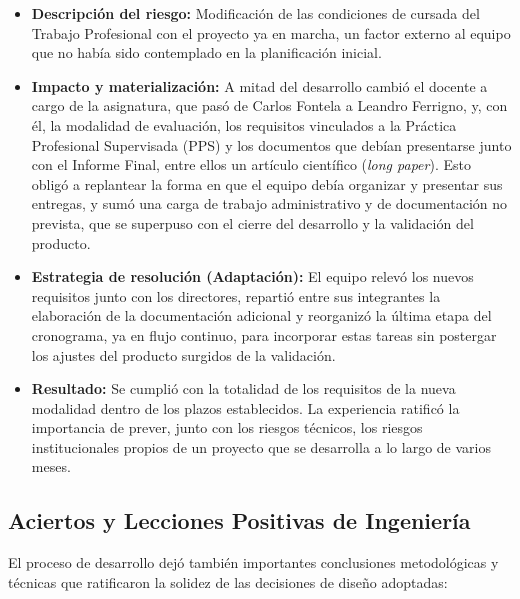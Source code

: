 \begin{itemize}
    \item \textbf{Descripción del riesgo:} Modificación de las condiciones de cursada del Trabajo Profesional con el proyecto ya en marcha, un factor externo al equipo que no había sido contemplado en la planificación inicial.
    \item \textbf{Impacto y materialización:} A mitad del desarrollo cambió el docente a cargo de la asignatura, que pasó de Carlos Fontela a Leandro Ferrigno, y, con él, la modalidad de evaluación, los requisitos vinculados a la Práctica Profesional Supervisada (PPS) y los documentos que debían presentarse junto con el Informe Final, entre ellos un artículo científico (\textit{long paper}). Esto obligó a replantear la forma en que el equipo debía organizar y presentar sus entregas, y sumó una carga de trabajo administrativo y de documentación no prevista, que se superpuso con el cierre del desarrollo y la validación del producto.
    \item \textbf{Estrategia de resolución (Adaptación):} El equipo relevó los nuevos requisitos junto con los directores, repartió entre sus integrantes la elaboración de la documentación adicional y reorganizó la última etapa del cronograma, ya en flujo continuo, para incorporar estas tareas sin postergar los ajustes del producto surgidos de la validación.
    \item \textbf{Resultado:} Se cumplió con la totalidad de los requisitos de la nueva modalidad dentro de los plazos establecidos. La experiencia ratificó la importancia de prever, junto con los riesgos técnicos, los riesgos institucionales propios de un proyecto que se desarrolla a lo largo de varios meses.
\end{itemize}

\subsection{Aciertos y Lecciones Positivas de Ingeniería}

El proceso de desarrollo dejó también importantes conclusiones metodológicas y técnicas que ratificaron la solidez de las decisiones de diseño adoptadas:

